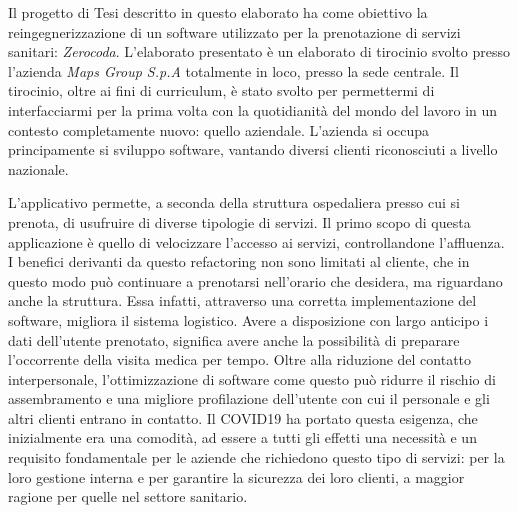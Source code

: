 \documentclass[a4paper,11pt]{article}
\begin{document}
	\maketitle
	   Il progetto di Tesi descritto in questo elaborato ha come obiettivo la reingegnerizzazione di un software utilizzato per la prenotazione di servizi sanitari: \emph{Zerocoda}. L'elaborato presentato è un elaborato di tirocinio svolto presso l'azienda \emph{Maps Group S.p.A} totalmente in loco, presso la sede centrale. Il tirocinio, oltre ai fini di curriculum, è stato svolto per permettermi di interfacciarmi per la prima volta con la quotidianità del mondo del lavoro in un contesto completamente nuovo: quello aziendale. L'azienda si occupa principamente si sviluppo software, vantando diversi clienti riconosciuti a livello nazionale.
	   
	   L'applicativo permette, a seconda della struttura ospedaliera presso cui si prenota, di usufruire di diverse tipologie di servizi. Il primo scopo di questa applicazione è quello di velocizzare l'accesso ai servizi, controllandone l’affluenza. I benefici derivanti da questo refactoring non sono limitati al cliente, che in questo modo può continuare a prenotarsi nell'orario che desidera, ma riguardano anche la struttura. Essa infatti, attraverso una corretta implementazione del software, migliora il sistema logistico. Avere a disposizione con largo anticipo i dati dell'utente prenotato, significa avere anche la possibilità di preparare l'occorrente della visita medica per tempo. Oltre alla riduzione del contatto interpersonale, l’ottimizzazione di software come questo può ridurre il rischio di assembramento e una migliore profilazione dell’utente con cui il personale e gli altri clienti entrano in contatto. Il COVID19 ha portato questa esigenza, che inizialmente era una comodità, ad essere a tutti gli effetti una necessità e un requisito fondamentale per le aziende che richiedono questo tipo di servizi: per la loro gestione interna e per garantire la sicurezza dei loro clienti, a maggior ragione per quelle nel settore sanitario. 
	   
\end{document}

